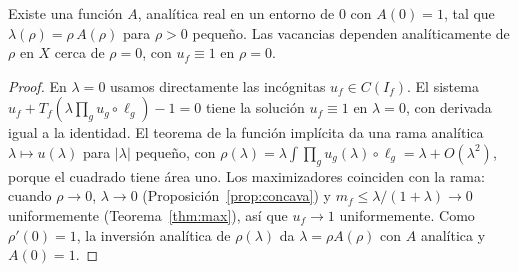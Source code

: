 \begin{proposicion}\label{prop:diluido}
Existe una función $A$, analítica real en un entorno de $0$ con $A(0)=1$, tal que
$\lambda(\rho)=\rho\,A(\rho)$ para $\rho>0$ pequeño. Las vacancias dependen analíticamente de $\rho$
en $X$ cerca de $\rho=0$, con $u_f\equiv1$ en $\rho=0$.
\end{proposicion}

\begin{proof}
En $\lambda=0$ usamos directamente las incógnitas $u_f\in C(I_f)$. El sistema
$u_f+T_f(\lambda\prod_gu_g\circ\ell_g)-1=0$ tiene la solución $u_f\equiv1$ en $\lambda=0$, con derivada
igual a la identidad. El teorema de la función implícita da una rama analítica $\lambda\mapsto u(\lambda)$
para $|\lambda|$ pequeño, con $\rho(\lambda)=\lambda\int\prod_gu_g(\lambda)\circ\ell_g=\lambda+O(\lambda^2)$,
porque el cuadrado tiene área uno. Los maximizadores coinciden con la rama: cuando $\rho\to0$,
$\lambda\to0$ (Proposición~\ref{prop:concava}) y $m_f\le\lambda/(1+\lambda)\to0$ uniformemente
(Teorema~\ref{thm:max}), así que $u_f\to1$ uniformemente. Como $\rho'(0)=1$, la inversión analítica de
$\rho(\lambda)$ da $\lambda=\rho A(\rho)$ con $A$ analítica y $A(0)=1$.
\end{proof}
